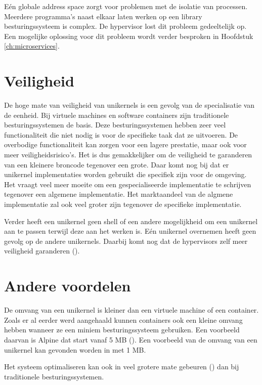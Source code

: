 Eén globale address space zorgt voor problemen met de isolatie van processen. Meerdere programma's naast elkaar laten werken op een library besturingssysteem is complex. De hypervisor lost dit probleem gedeeltelijk op. Een mogelijke oplossing voor dit probleem wordt verder besproken in Hoofdstuk \ref{ch:microservices}.

\section{Veiligheid}

De hoge mate van veiligheid van unikernels is een gevolg van de specialisatie van de eenheid. Bij virtuele machines en software containers zijn traditionele besturingssystemen de basis. Deze besturingssystemen hebben zeer veel functionaliteit die niet nodig is voor de specifieke taak dat ze uitvoeren. De overbodige functionaliteit kan zorgen voor een lagere prestatie, maar ook voor meer veiligheidsrisico's. Het is dus gemakkelijker om de veiligheid te garanderen van een kleinere broncode tegenover een grote. Daar komt nog bij dat er unikernel implementaties worden gebruikt die specifiek zijn voor de omgeving. Het vraagt veel meer moeite om een gespecialiseerde implementatie te schrijven tegenover een algemene implementatie. Het marktaandeel van de algmene implementatie zal ook veel groter zijn tegenover de specifieke implementatie.

Verder heeft een unikernel geen shell of een andere mogelijkheid om een unikernel aan te passen terwijl deze aan het werken is. Eén unikernel overnemen heeft geen gevolg op de andere unikernels. Daarbij komt nog dat de hypervisors zelf meer veiligheid garanderen (\cite{colp_breaking_2011}).

\section{Andere voordelen}
\label{sec:bene_unikernels}

De omvang van een unikernel is kleiner dan een virtuele machine of een container. Zoals er al eerder werd aangehaald kunnen containers ook een kleine omvang hebben wanneer ze een miniem besturingssysteem gebruiken. Een voorbeeld daarvan is Alpine dat start vanaf 5 MB (\cite{_gliderlabs/docker-alpine_????}).
Een voorbeeld van de omvang van een unikernel kan gevonden worden in \cite[hoofdstuk 4, p.~10]{madhavapeddy_jitsu:_2015} met 1 MB.

Het systeem optimaliseren kan ook in veel grotere mate gebeuren (\cite{madhavapeddy_turning_2010}) dan bij traditionele besturingssystemen.

